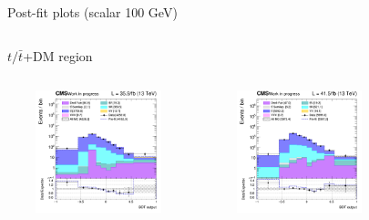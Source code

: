 \documentclass[8pt]{beamer}
\begin{document}
\begin{frame}{Post-fit plots (scalar 100 GeV)}
\begin{columns}
\begin{column}{1.09\textwidth}
\begin{block}{\centering $t/\bar t$+DM region}\end{block} \vspace{10pt}
\end{column}
\end{columns} \vspace{-24pt}
\begin{columns}
		\begin{column}{0.33\textwidth}
			\begin{center}
			\begin{block}{}\end{block}	
     			\includegraphics[width=1.0\textwidth, height=100pt]{figs/postfits/2016/log_cratio_ST_topCR_ll_BDT_tDM100_TTbar_BDT_output_scalar100_customBinsAttempt7.png}
    		\end{center}		
		\end{column} 
		\begin{column}{0.33\textwidth}
			\begin{center}
			\begin{block}{}\end{block}	
     			\includegraphics[width=1.0\textwidth, height=100pt]{figs/postfits/2017/log_cratio_ST_topCR_ll_BDT_tDM100_TTbar_BDT_output_scalar100_customBinsAttempt7.png}
    		\end{center}		
		\end{column} 
		\begin{column}{0.33\textwidth}
			\begin{center}
			\begin{block}{}\end{block}	

\end{center}
\end{column}
\end{columns}
\end{frame}
\end{document}
